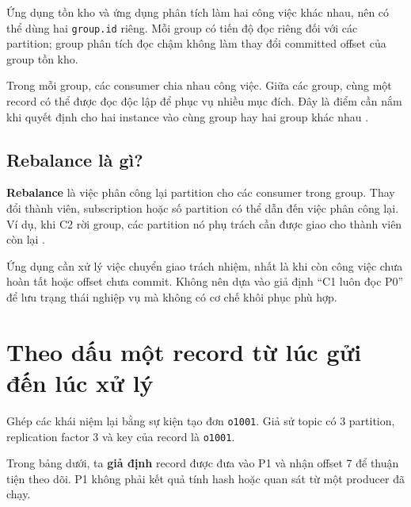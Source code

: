 Ứng dụng tồn kho và ứng dụng phân tích làm hai công việc khác nhau, nên có thể dùng hai \texttt{group.\allowbreak{}id} riêng. Mỗi group có tiến độ đọc riêng đối với các partition; group phân tích đọc chậm không làm thay đổi committed offset của group tồn kho.


Trong mỗi group, các consumer chia nhau công việc. Giữa các group, cùng một record có thể được đọc độc lập để phục vụ nhiều mục đích. Đây là điểm cần nắm khi quyết định cho hai instance vào cùng group hay hai group khác nhau \cite{kafka-consumer-api}.


\FloatBarrier
{}
\subsection{Rebalance là gì?}

\textbf{Rebalance} là việc phân công lại partition cho các consumer trong group. Thay đổi thành viên, subscription hoặc số partition có thể dẫn đến việc phân công lại. Ví dụ, khi C2 rời group, các partition nó phụ trách cần được giao cho thành viên còn lại \cite{kafka-rebalance}.


Ứng dụng cần xử lý việc chuyển giao trách nhiệm, nhất là khi còn công việc chưa hoàn tất hoặc offset chưa commit. Không nên dựa vào giả định “C1 luôn đọc P0” để lưu trạng thái nghiệp vụ mà không có cơ chế khôi phục phù hợp.


\FloatBarrier
{}
\section{Theo dấu một record từ lúc gửi đến lúc xử lý}

Ghép các khái niệm lại bằng sự kiện tạo đơn \texttt{o1001}. Giả sử topic có 3 partition, replication factor 3 và key của record là \texttt{o1001}.


Trong bảng dưới, ta \textbf{giả định} record được đưa vào P1 và nhận offset 7 để thuận tiện theo dõi. P1 không phải kết quả tính hash hoặc quan sát từ một producer đã chạy.


